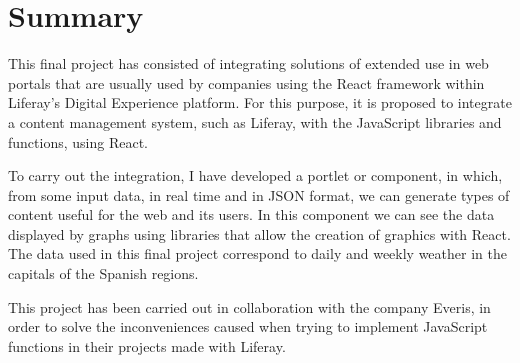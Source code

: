 \documentclass[a4paper, 12pt]{book}
\begin{document}


\chapter*{Summary}
This final project has consisted of integrating solutions of extended use in web portals that are usually used by companies using the React framework within Liferay's Digital Experience platform. For this purpose, it is proposed to integrate a content management system, such as Liferay, with the JavaScript libraries and functions, using React.

\vspace{5mm}
To carry out the integration, I have developed a portlet or component, in which, from some input data, in real time and in JSON format, we can generate types of content useful for the web and its users. In this component we can see the data displayed by graphs using libraries that allow the creation of graphics with React. The data used in this final project correspond to daily and weekly weather in the capitals of the Spanish regions.

\vspace{5mm}
This project has been carried out in collaboration with the company Everis, in order to solve the inconveniences caused when trying to implement JavaScript functions in their projects made with Liferay.






\end{document}
